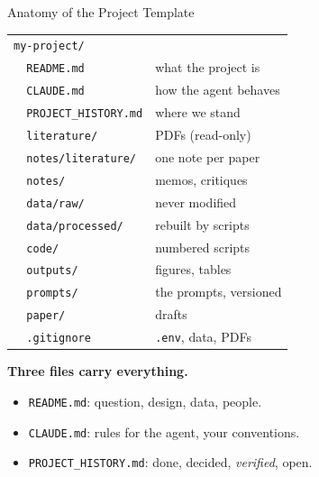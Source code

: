 \documentclass[svgnames,x11names,dvipsnames]{beamer}
\begin{document}
\begin{frame}{Anatomy of the Project Template}

\centering
{\scriptsize
\renewcommand{\arraystretch}{1.05}
\setlength{\tabcolsep}{8pt}
\begin{tabular}{@{}ll@{}}
\texttt{my-project/} & \\
\texttt{\ \ \textcolor{accentred}{README.md}} & \textcolor{accentred}{what the project is} \\
\texttt{\ \ \textcolor{accentred}{CLAUDE.md}} & \textcolor{accentred}{how the agent behaves} \\
\texttt{\ \ \textcolor{accentred}{PROJECT\_HISTORY.md}} & \textcolor{accentred}{where we stand} \\
\texttt{\ \ literature/} & PDFs (read-only) \\
\texttt{\ \ notes/literature/} & one note per paper \\
\texttt{\ \ notes/} & memos, critiques \\
\texttt{\ \ data/raw/} & never modified \\
\texttt{\ \ data/processed/} & rebuilt by scripts \\
\texttt{\ \ code/} & numbered scripts \\
\texttt{\ \ outputs/} & figures, tables \\
\texttt{\ \ prompts/} & the prompts, versioned \\
\texttt{\ \ paper/} & drafts \\
\texttt{\ \ .gitignore} & \texttt{.env}, data, PDFs \\
\end{tabular}
}

\vspace{0.35cm}
\raggedright
\textbf{Three files carry everything.}
\begin{itemize}
    \item \texttt{\textcolor{accentred}{README.md}}: question, design, data, people.
    \item \texttt{\textcolor{accentred}{CLAUDE.md}}: rules for the agent, your conventions.
    \item \texttt{\textcolor{accentred}{PROJECT\_HISTORY.md}}: done, decided, \emph{verified}, open.
\end{itemize}

\end{frame}
\end{document}
